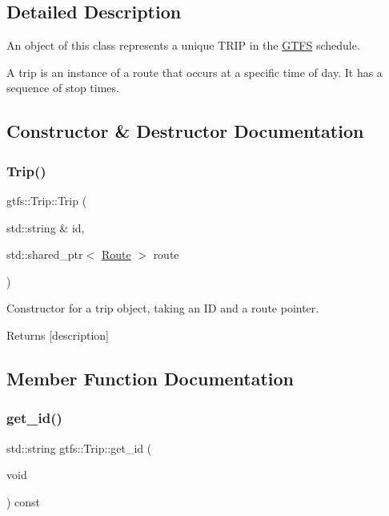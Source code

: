 \subsection{Detailed Description}
An object of this class represents a unique T\+R\+IP in the \hyperlink{classgtfs_1_1GTFS}{G\+T\+FS} schedule.

A trip is an instance of a route that occurs at a specific time of day. It has a sequence of stop times. 

\subsection{Constructor \& Destructor Documentation}
\mbox{\label{classgtfs_1_1Trip_a3014ee32fdb5abd550ad20088c91aae6}} 
\subsubsection{\texorpdfstring{Trip()}{Trip()}}
{\footnotesize\ttfamily gtfs\+::\+Trip\+::\+Trip (\begin{DoxyParamCaption}\item[{std\+::string \&}]{id,  }\item[{std\+::shared\+\_\+ptr$<$ \hyperlink{classgtfs_1_1Route}{Route} $>$}]{route }\end{DoxyParamCaption})}

Constructor for a trip object, taking an ID and a route pointer. \begin{DoxyReturn}{Returns}
\mbox{[}description\mbox{]} 
\end{DoxyReturn}


\subsection{Member Function Documentation}
\mbox{\label{classgtfs_1_1Trip_ac4c80cbf34f7c715104cc1c33b082f58}} 
\subsubsection{\texorpdfstring{get\+\_\+id()}{get\_id()}}
{\footnotesize\ttfamily std\+::string gtfs\+::\+Trip\+::get\+\_\+id (\begin{DoxyParamCaption}\item[{void}]{ }\end{DoxyParamCaption}) const\hspace{0.3cm}{\ttfamily [inline]}}

